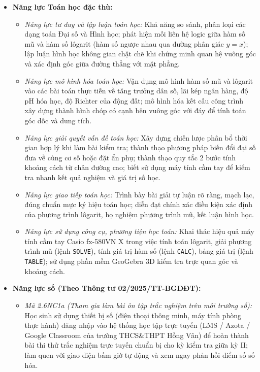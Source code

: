 \documentclass[12pt, a4paper]{article}
\begin{document}
\begin{itemize}[leftmargin=1.2cm]
    \item \textbf{Năng lực Toán học đặc thù:}
    \begin{itemize}[leftmargin=0.6cm]
        \item \textit{Năng lực tư duy và lập luận toán học:} Khả năng so sánh, phân loại các dạng toán Đại số và Hình học; phát hiện mối liên hệ logic giữa hàm số mũ và hàm số lôgarit (hàm số ngược nhau qua đường phân giác $y = x$); lập luận hình học không gian chặt chẽ khi chứng minh quan hệ vuông góc và xác định góc giữa đường thẳng với mặt phẳng.
        \item \textit{Năng lực mô hình hóa toán học:} Vận dụng mô hình hàm số mũ và lôgarit vào các bài toán thực tiễn về tăng trưởng dân số, lãi kép ngân hàng, độ pH hóa học, độ Richter của động đất; mô hình hóa kết cấu công trình xây dựng thành hình chóp có cạnh bên vuông góc với đáy để tính toán góc dốc và dung tích.
        \item \textit{Năng lực giải quyết vấn đề toán học:} Xây dựng chiến lược phân bổ thời gian hợp lý khi làm bài kiểm tra; thành thạo phương pháp biến đổi đại số đưa về cùng cơ số hoặc đặt ẩn phụ; thành thạo quy tắc 2 bước tính khoảng cách từ chân đường cao; biết sử dụng máy tính cầm tay để kiểm tra nhanh kết quả nghiệm và giá trị số học.
        \item \textit{Năng lực giao tiếp toán học:} Trình bày bài giải tự luận rõ ràng, mạch lạc, đúng chuẩn mực ký hiệu toán học; diễn đạt chính xác điều kiện xác định của phương trình lôgarit, họ nghiệm phương trình mũ, kết luận hình học.
        \item \textit{Năng lực sử dụng công cụ, phương tiện học toán:} Khai thác hiệu quả máy tính cầm tay Casio fx-580VN X trong việc tính toán lôgarit, giải phương trình mũ (lệnh \texttt{SOLVE}), tính giá trị hàm số (lệnh \texttt{CALC}), bảng giá trị (lệnh \texttt{TABLE}); sử dụng phần mềm GeoGebra 3D kiểm tra trực quan góc và khoảng cách.
    \end{itemize}

    \item \textbf{Năng lực số (Theo Thông tư 02/2025/TT-BGDĐT):}
    \begin{itemize}[leftmargin=0.6cm]
        \item \textit{Mã 2.6NC1a (Tham gia làm bài ôn tập trắc nghiệm trên môi trường số):} Học sinh sử dụng thiết bị số (điện thoại thông minh, máy tính phòng thực hành) đăng nhập vào hệ thống học tập trực tuyến (LMS / Azota / Google Classroom của trường THCS\&THPT Hồng Vân) để hoàn thành bài thi thử trắc nghiệm trực tuyến chuẩn bị cho kỳ kiểm tra giữa kỳ II; làm quen với giao diện bấm giờ tự động và xem ngay phản hồi điểm số số hóa.
    \end{itemize}


\end{itemize}
\end{document}
